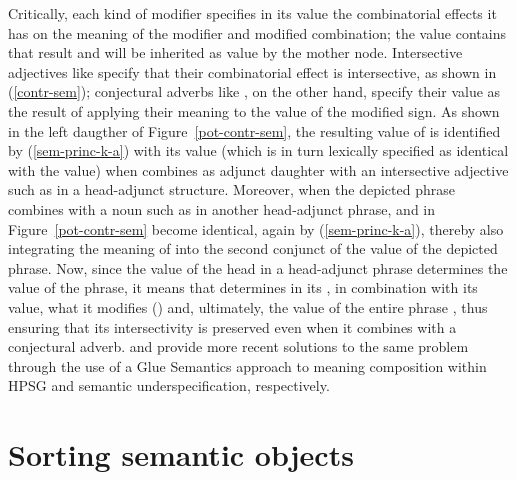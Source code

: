 \documentclass[output=paper
	        ,collection
	        ,collectionchapter
 	        ,biblatex
                ,babelshorthands
                ,newtxmath
                ,draftmode
                ,colorlinks, citecolor=brown
]{langscibook}
\begin{document}
Critically, each kind of modifier specifies in its  value the combinatorial effects it has on the meaning of the modifier and modified combination; the  value contains that result and will be inherited as  value by the mother node. Intersective adjectives like  specify that their combinatorial effect is intersective, as shown in (\ref{contr-sem}); conjectural adverbs like , on the other hand, specify their  value as the result of applying their meaning to the  value of the modified sign. As shown in the left daugther of Figure~\ref{pot-contr-sem}, the resulting  value of  is identified by (\ref{sem-princ-k-a}) with its  value (which is in turn lexically specified as identical with the  value) when  combines as adjunct daughter with an intersective adjective such as  in a head-adjunct structure. Moreover, when the depicted phrase  combines with a noun such as  in another head-adjunct phrase,  and  in Figure~\ref{pot-contr-sem} become identical, again by (\ref{sem-princ-k-a}), thereby also integrating the meaning of  into the second conjunct of the  value of the depicted phrase. Now, since the  value of the head in a head-adjunct phrase determines the  value of the phrase, it means that  determines in its , in combination with its  value, what it modifies () and, ultimately, the  value of the entire phrase , thus ensuring that its intersectivity is preserved even when it combines with a conjectural adverb. \citet{AsudehandCrouch2002} and \citet{Egg2004b} provide more recent solutions to the same problem through the use of a Glue Semantics approach to meaning composition within HPSG and semantic underspecification, respectively.

\section{Sorting semantic objects}
\end{document}
